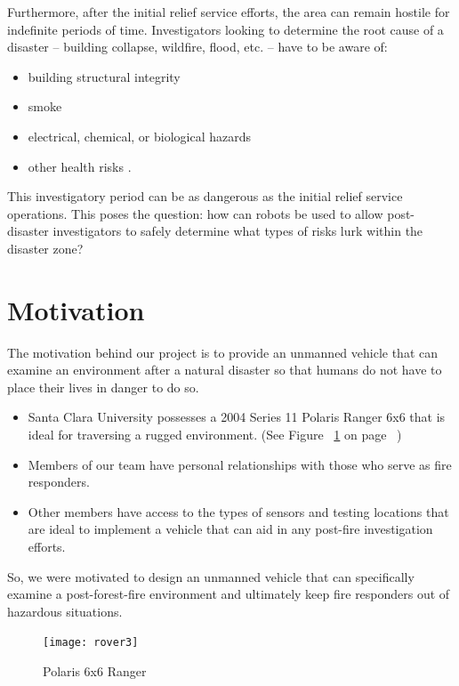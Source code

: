 Furthermore, after the initial relief service efforts, the area can remain hostile for indefinite periods of time.  Investigators looking to determine the root cause of a disaster -- building collapse, wildfire, flood, etc. -- have to be aware of:
\begin{itemize}
  \item building structural integrity
  \item smoke
  \item electrical, chemical, or biological hazards
  \item other health risks \cite{firearsonsceneevidence}.
\end{itemize}   This investigatory period can be as dangerous as the initial relief service operations. This poses the question: how can robots be used to allow post-disaster investigators to safely determine what types of risks lurk within the disaster zone?

\section{Motivation}
The motivation behind our project is to provide an unmanned vehicle that can examine an environment after a natural disaster so that humans do not have to place their lives in danger to do so. 
\begin{itemize}
\item Santa Clara University possesses a 2004 Series 11 Polaris Ranger 6x6 that is ideal for traversing a rugged environment. (See Figure ~\ref{fig:rover3fig} on page ~\pageref{fig:rover3fig})
\item Members of our team have personal relationships with those who serve as fire responders.
\item Other members have access to the types of sensors and testing locations that are ideal to implement a vehicle that can aid in any post-fire investigation efforts.
\end{itemize} 
So, we were motivated to design an unmanned vehicle that can specifically examine a post-forest-fire environment and ultimately keep fire responders out of hazardous situations.

\begin{figure}[H]
\centering
\texttt{[image: rover3]}
\caption{Polaris 6x6 Ranger}
\label{fig:rover3fig}
\end{figure}

